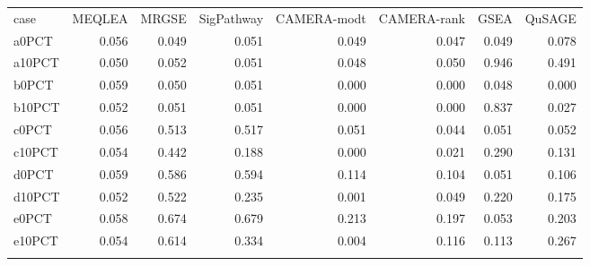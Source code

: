 \documentclass[a4,center,fleqn]{NAR}
\newcommand{\OurMethod}{MEQLEA}
\newcommand{\CMR}{CAMERA-rank}
\newcommand{\CMT}{CAMERA-modt}
\newcommand{\gent}{SigPathway}
\newcommand{\genr}{MRGSE}
\begin{document}
		\begin{table}[ht]
			\centering
			\begin{tabular}{lrrrrrrr}
				\toprule
				case & \OurMethod & \genr & \gent & \CMT & \CMR & GSEA & QuSAGE \\ 
				\colrule
				a0PCT & 0.056 & 0.049 & 0.051 & 0.049 & 0.047 & 0.049 & 0.078 \\ 
				a10PCT & 0.050 & 0.052 & 0.051 & 0.048 & 0.050 & 0.946 & 0.491 \\ 
				b0PCT & 0.059 & 0.050 & 0.051 & 0.000 & 0.000 & 0.048 & 0.000 \\ 
				b10PCT & 0.052 & 0.051 & 0.051 & 0.000 & 0.000 & 0.837 & 0.027 \\ 
				c0PCT & 0.056 & 0.513 & 0.517 & 0.051 & 0.044 & 0.051 & 0.052 \\ 
				c10PCT & 0.054 & 0.442 & 0.188 & 0.000 & 0.021 & 0.290 & 0.131 \\ 
				d0PCT & 0.059 & 0.586 & 0.594 & 0.114 & 0.104 & 0.051 & 0.106 \\ 
				d10PCT & 0.052 & 0.522 & 0.235 & 0.001 & 0.049 & 0.220 & 0.175 \\ 
				e0PCT & 0.058 & 0.674 & 0.679 & 0.213 & 0.197 & 0.053 & 0.203 \\ 
				e10PCT & 0.054 & 0.614 & 0.334 & 0.004 & 0.116 & 0.113 & 0.267 \\ 
				\botrule
			\end{tabular}
		\end{table}
		
	
	\newpage
	
	
	
	
	

	
	
\end{document}
